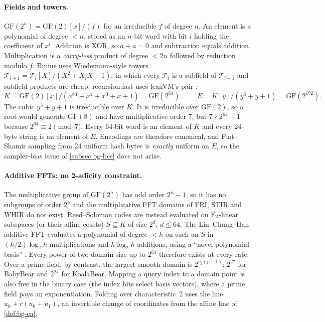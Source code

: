 \paragraph{Fields and towers.} $\mathrm{GF}(2^n)=\mathrm{GF}(2)[x]/(f)$ for an irreducible $f$ of
degree $n$. An element is a polynomial of degree $<n$, stored as an $n$-bit word with bit $i$
holding the coefficient of $x^i$. Addition is XOR, so $a+a=0$ and subtraction equals addition.
Multiplication is a \emph{carry-less} product of degree $<2n$ followed by reduction modulo $f$.
Binius \cite{DP23-Binius} uses Wiedemann-style towers $\mathcal T_{i+1}=\mathcal T_i[X]/(X^2+X_iX+1)$,
in which every $\mathcal T_i$ is a subfield of $\mathcal T_{i+1}$ and subfield products are cheap.
recursion.fast uses leanVM's pair \cite{leanVM}:
\[
  K=\mathrm{GF}(2)[x]/(x^{64}+x^4+x^3+x+1)=\mathrm{GF}(2^{64}),\qquad
  E=K[y]/(y^3+y+1)=\mathrm{GF}(2^{192}).
\]
The cubic $y^3+y+1$ is irreducible over $K$. It is irreducible over $\mathrm{GF}(2)$, so a root
would generate $\mathrm{GF}(8)$ and have multiplicative order $7$, but $7\nmid 2^{64}-1$ because
$2^{64}\equiv2\pmod 7$. Every 64-bit word is an element of $K$ and every 24-byte string is an
element of $E$. Encodings are therefore canonical, and Fiat--Shamir sampling from 24 uniform hash
bytes is \emph{exactly} uniform on $E$, so the sampler-bias issue of \cref{subsec:bg-bcs} does not
arise.

\paragraph{Additive FFTs: no 2-adicity constraint.} The multiplicative group of
$\mathrm{GF}(2^n)$ has odd order $2^n-1$, so it has no subgroups of order $2^k$ and the
multiplicative FFT domains of FRI, STIR and WHIR do not exist. Reed--Solomon codes are instead
evaluated on $\mathbb{F}_2$-linear subspaces (or their affine cosets) $S\subseteq K$ of size $2^{d}$,
$d\le 64$. The Lin--Chung--Han additive FFT evaluates a polynomial of degree $<h$ on such an $S$
in $(h/2)\log_2h$ multiplications and $h\log_2h$ additions, using a ``novel polynomial basis''
\cite{LCH14-AdditiveFFT}. Every power-of-two domain size up to $2^{64}$ therefore exists at every
rate. Over a prime field, by contrast, the largest smooth domain is $2^{v_2(p-1)}$: $2^{27}$ for
BabyBear and $2^{24}$ for KoalaBear. Mapping a query index to a domain point is also free in the
binary case (the index bits select basis vectors), where a prime field pays an exponentiation.
Folding over characteristic~2 uses the line $u_0+r(u_0+u_1)$, an invertible change of
coordinates from the affine line of \cref{def:bg-ca}.


